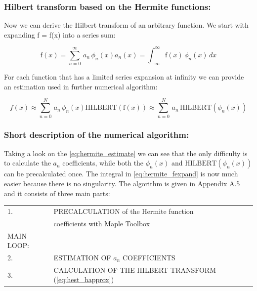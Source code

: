 \documentclass[12pt,twoside,a4paper]{article}
\numberwithin{equation}{subsection}
\numberwithin{figure}{subsection}
\begin{document}
\subsubsection*{Hilbert transform based on the Hermite functions:}

Now we can derive the Hilbert transform of an arbitrary function. We start with expanding f = f(x) into a series sum:

\begin{subequations} \label{eq:hermite_fexpand}
  \begin{equation}   \label{eq:hfe_f}
     \mathrm{f}(x) = \sum_{n = 0}^{\infty } \, a_n \, \phi_n(x) 
  \end{equation}
  \begin{equation}   \label{eq:hfe_an}
     a_n(x) = \int_{ - \infty }^{\infty } \mathrm{f}(x) \, \phi_n (x) \, dx
  \end{equation}
\end{subequations}

For each function that has a limited series expansion at infinity we can provide an estimation used in further numerical algorithm:

\begin{subequations} \label{eq:hermite_estimate}
  \begin{equation}   \label{eq:hest_fapprox}
      f(x) \approx \sum_{n = 0}^{N} \, a_n \, \phi_n (x)
  \end{equation}
  \begin{equation}   \label{eq:hest_happrox}
     \mathrm{HILBERT} (\mathrm{f}(x)) \approx \sum_{n = 0} ^ {N} \, a_n \, \mathrm{HILBERT}(\phi_n (x))
  \end{equation}
\end{subequations}

\subsubsection*{Short description of the numerical algorithm:}

Taking a look on the \ref{eq:hermite_estimate} we can see that the only difficulty is to calculate the $a_n$ coefficients,
while both the $\phi_n (x)$ and $\mathrm{HILBERT}(\phi_n (x))$ can be precalculated once. The integral in
\ref{eq:hermite_fexpand} is now much easier because there is no singularity. The algorithm is given in Appendix A.5 and it
consists of three main parts:

\begin{tabular}{l l}
  1.         & PRECALCULATION of the Hermite function \\
             & coefficients with Maple Toolbox \\
  MAIN LOOP: & \\
  2.         & ESTIMATION OF ${a_{n}}$ COEFFICIENTS \\
  3.         & CALCULATION OF THE HILBERT TRANSFORM (\ref{eq:hest_happrox}) \\
\end{tabular}
\end{document}
